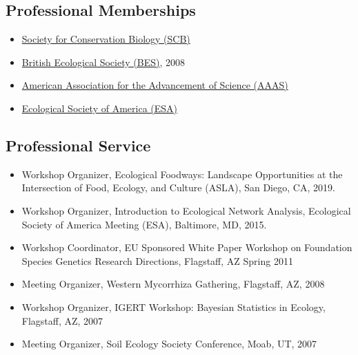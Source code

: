 \documentclass[a4paper]{article}
\begin{document}
\subsection{Professional Memberships}\label{professional-memberships}

\begin{itemize}
\item
  \href{http://www.conbio.org/}{Society for Conservation Biology
  (SCB)}
\item
  \href{http://www.aaas.org/}{British Ecological Society (BES)}, 2008
\item
  \href{http://www.aaas.org/}{American Association for the Advancement
  of Science (AAAS)}
\item
  \href{http://www.esa.org/}{Ecological Society of America (ESA)}
\end{itemize}


\subsection{Professional Service}\label{professional-service}

\begin{itemize}
\item 
  Workshop Organizer, Ecological Foodways: Landscape Opportunities at
  the Intersection of Food, Ecology, and Culture (ASLA), San Diego,
  CA, 2019.
\item 
  Workshop Organizer, Introduction to Ecological Network Analysis,
  Ecological Society of America Meeting (ESA), Baltimore, MD, 2015.
\item
  Workshop Coordinator, EU Sponsored White Paper Workshop on Foundation
  Species Genetics Research Directions, Flagstaff, AZ Spring 2011
\item
  Meeting Organizer, Western Mycorrhiza Gathering, Flagstaff, AZ, 2008
\item
  Workshop Organizer, IGERT Workshop: Bayesian Statistics in Ecology,
  Flagstaff, AZ, 2007
\item
  Meeting Organizer, Soil Ecology Society Conference, Moab, UT, 2007
\end{itemize}
\end{document}

